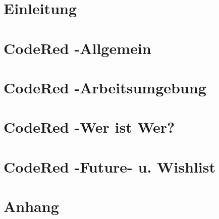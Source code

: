 \documentclass[11pt,a4paper,titlepage,openright,multicol]{scrbook}
\begin{document}
\frontmatter

\mainmatter



\tableofcontents

\part{Einleitung}
\label{part:Einleitung}





\part{CodeRed -Allgemein}
\label{part:CodeRed -Allgemein}




\part{CodeRed -Arbeitsumgebung}
\label{part:Arbeitsumgebung}




\part{CodeRed -Wer ist Wer?}
\label{part:Wer ist Wer?}





\part{CodeRed -Future- u. Wishlist}
\label{part:Future- u. Wishlist}



\backmatter
\appendix
\part{Anhang}
\label{part:Anhang}



\printglossary

\listoffigures

\listoftables

\lstlistoflistings

\printindex

\end{document}
